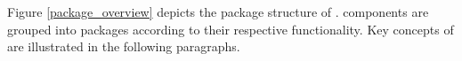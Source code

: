 Figure \ref{package_overview} depicts the package structure of \salespoint{}.
\salespoint{} components are grouped into packages according to their respective functionality.
Key concepts of \salespoint{} are illustrated in the following paragraphs.











